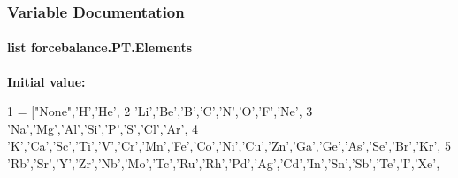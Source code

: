 \subsubsection{Variable Documentation}
\hypertarget{namespaceforcebalance_1_1PT_a0f13655c53f6d777f685d23e1a06ba57}{
\paragraph[{Elements}]{\setlength{\rightskip}{0pt plus 5cm}list forcebalance.\-P\-T.\-Elements}}\label{namespaceforcebalance_1_1PT_a0f13655c53f6d777f685d23e1a06ba57}
{\bfseries Initial value\-:}
\begin{DoxyCode}
1 = [\textcolor{stringliteral}{"None"},\textcolor{stringliteral}{'H'},\textcolor{stringliteral}{'He'},
2             \textcolor{stringliteral}{'Li'},\textcolor{stringliteral}{'Be'},\textcolor{stringliteral}{'B'},\textcolor{stringliteral}{'C'},\textcolor{stringliteral}{'N'},\textcolor{stringliteral}{'O'},\textcolor{stringliteral}{'F'},\textcolor{stringliteral}{'Ne'},
3             \textcolor{stringliteral}{'Na'},\textcolor{stringliteral}{'Mg'},\textcolor{stringliteral}{'Al'},\textcolor{stringliteral}{'Si'},\textcolor{stringliteral}{'P'},\textcolor{stringliteral}{'S'},\textcolor{stringliteral}{'Cl'},\textcolor{stringliteral}{'Ar'},
4             \textcolor{stringliteral}{'K'},\textcolor{stringliteral}{'Ca'},\textcolor{stringliteral}{'Sc'},\textcolor{stringliteral}{'Ti'},\textcolor{stringliteral}{'V'},\textcolor{stringliteral}{'Cr'},\textcolor{stringliteral}{'Mn'},\textcolor{stringliteral}{'Fe'},\textcolor{stringliteral}{'Co'},\textcolor{stringliteral}{'Ni'},\textcolor{stringliteral}{'Cu'},\textcolor{stringliteral}{'Zn'},\textcolor{stringliteral}{'Ga'},\textcolor{stringliteral}{'Ge'},\textcolor{stringliteral}{'As'},\textcolor{stringliteral}{'Se'},\textcolor{stringliteral}{'Br'},\textcolor{stringliteral}{'Kr'},
5             \textcolor{stringliteral}{'Rb'},\textcolor{stringliteral}{'Sr'},\textcolor{stringliteral}{'Y'},\textcolor{stringliteral}{'Zr'},\textcolor{stringliteral}{'Nb'},\textcolor{stringliteral}{'Mo'},\textcolor{stringliteral}{'Tc'},\textcolor{stringliteral}{'Ru'},\textcolor{stringliteral}{'Rh'},\textcolor{stringliteral}{'Pd'},\textcolor{stringliteral}{'Ag'},\textcolor{stringliteral}{'Cd'},\textcolor{stringliteral}{'In'},\textcolor{stringliteral}{'Sn'},\textcolor{stringliteral}{'Sb'},\textcolor{stringliteral}{'Te'},\textcolor{stringliteral}{'I'},\textcolor{stringliteral}{'Xe'},

\end{DoxyCode}
